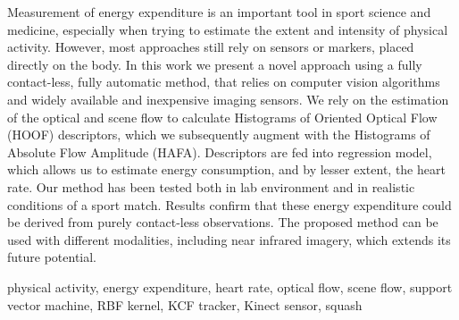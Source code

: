 \abstractp
Measurement of energy expenditure is an important tool in sport science and medicine, especially when trying to estimate the extent and intensity of physical activity. However, most approaches still rely on sensors or markers, placed directly on the body. In this work we present a novel approach using a fully contact-less, fully automatic method, that relies on computer vision algorithms and widely available and inexpensive imaging sensors. We rely on the estimation of the optical and scene flow to calculate Histograms of Oriented Optical Flow (HOOF) descriptors, which we subsequently augment with the Histograms of Absolute Flow Amplitude (HAFA). Descriptors are fed into regression model, which allows us to estimate energy consumption, and by lesser extent, the heart rate. Our method has been tested both in lab environment and in realistic conditions of a sport match. Results confirm that these energy expenditure could be derived from purely contact-less observations. The proposed method can be used with different modalities, including near infrared imagery, which extends its future potential.

\keywords physical activity, energy expenditure, heart rate, optical flow, scene flow, support vector machine, RBF kernel, KCF tracker, Kinect sensor, squash